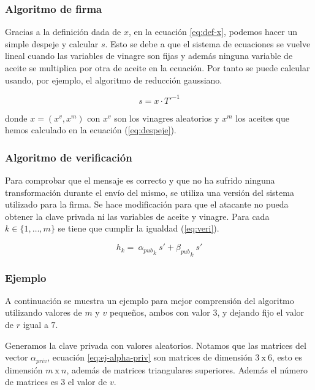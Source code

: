 \subsubsection{Algoritmo de firma}

Gracias a la definición dada de $x$, en la ecuación \ref{eq:def-x}, podemos hacer un simple despeje y calcular $s$. Esto se debe a que el sistema de ecuaciones se vuelve lineal cuando las variables de vinagre son fijas y además ninguna variable de aceite se multiplica por otra de aceite en la ecuación. Por tanto se puede calcular usando, por ejemplo, el algoritmo de reducción gaussiano.

\begin{equation}\label{eq:firma}
	s = x \cdot T'^{-1}
\end{equation}

donde $x = (x^v, x^m)$ con $x^v$ son los vinagres aleatorios y $x^m$ los aceites que hemos calculado en la ecuación (\ref{eq:despeje}).




\subsubsection{Algoritmo de verificación}

Para comprobar que el mensaje es correcto y que no ha sufrido ninguna transformación durante el envío del mismo, se utiliza una versión del sistema utilizado para la firma. Se hace modificación para que el atacante no pueda obtener la clave privada ni las variables de aceite y vinagre. Para cada $k \in  \{1,\dots, m\}$ se tiene que cumplir la igualdad (\ref{eq:veri}).


\begin{equation}\label{eq:veri}
	h_k = \ {\alpha_{pub}}_k \ s' + {\beta_{pub}}_{k} \ s'
\end{equation}

\subsubsection{Ejemplo}

A continuación se muestra un ejemplo para mejor comprensión del algoritmo utilizando valores de $m$ y $v$ pequeños, ambos con valor $3$, y dejando fijo el valor de $r$ igual a $7$.

Generamos la clave privada con valores aleatorios. Notamos que las matrices del vector $\alpha_{priv}$, ecuación \ref{eq:ej-alpha-priv} son matrices de dimensión $3\ \mathrm{x}\ 6$, esto es dimensión $m\ \mathrm{x}\ n$, además de matrices triangulares superiores. Además el número de matrices es $3$ el valor de $v$.

